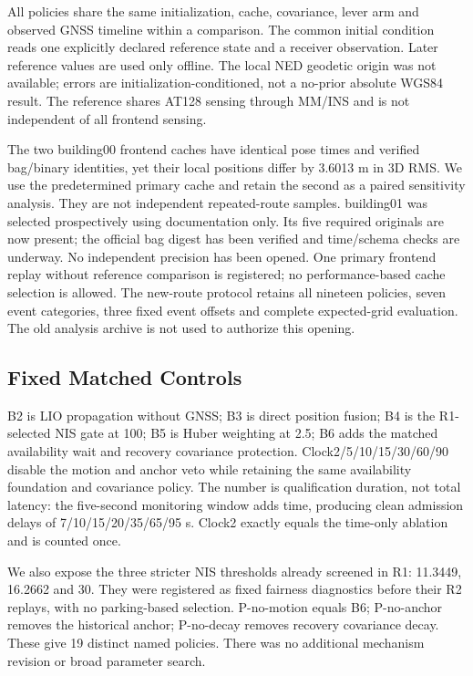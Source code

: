 \documentclass[conference]{IEEEtran}
\begin{document}
All policies share the same initialization, cache, covariance, lever arm and observed GNSS timeline within a comparison. The common initial condition reads one explicitly declared reference state and a receiver observation. Later reference values are used only offline. The local NED geodetic origin was not available; errors are initialization-conditioned, not a no-prior absolute WGS84 result. The reference shares AT128 sensing through MM/INS and is not independent of all frontend sensing.

The two building00 frontend caches have identical pose times and verified bag/binary identities, yet their local positions differ by 3.6013 m in 3D RMS. We use the predetermined primary cache and retain the second as a paired sensitivity analysis. They are not independent repeated-route samples. building01 was selected prospectively using documentation only. Its five required originals are now present; the official bag digest has been verified and time/schema checks are underway. No independent precision has been opened. One primary frontend replay without reference comparison is registered; no performance-based cache selection is allowed. The new-route protocol retains all nineteen policies, seven event categories, three fixed event offsets and complete expected-grid evaluation. The old analysis archive is not used to authorize this opening.

\subsection{Fixed Matched Controls}
B2 is LIO propagation without GNSS; B3 is direct position fusion; B4 is the R1-selected NIS gate at 100; B5 is Huber weighting at 2.5; B6 adds the matched availability wait and recovery covariance protection. Clock2/5/10/15/30/60/90 disable the motion and anchor veto while retaining the same availability foundation and covariance policy. The number is qualification duration, not total latency: the five-second monitoring window adds time, producing clean admission delays of 7/10/15/20/35/65/95 s. Clock2 exactly equals the time-only ablation and is counted once.

We also expose the three stricter NIS thresholds already screened in R1: 11.3449, 16.2662 and 30. They were registered as fixed fairness diagnostics before their R2 replays, with no parking-based selection. P-no-motion equals B6; P-no-anchor removes the historical anchor; P-no-decay removes recovery covariance decay. These give 19 distinct named policies. There was no additional mechanism revision or broad parameter search.
\end{document}
